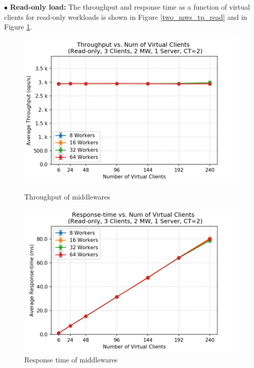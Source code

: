 $\bullet$ \textbf{Read-only load:} 
The throughput and response time as a function of virtual clients for read-only workloads is shown in Figure \ref{two_mws_tp_read} and in Figure \ref{two_mws_rt_read}. 
\begin{figure}[H]
   \begin{minipage}{0.48\textwidth}
     \centering
     \includegraphics[width=1\linewidth]{figures/2_BaselineWithMW/two_mws/two_mws_tp_read_2018-12-07_09h02.png}
     \caption{Throughput of middlewares}\label{two_mws_tp_read}
   \end{minipage}\hfill
   \begin{minipage}{0.48\textwidth}
     \centering
     \includegraphics[width=1\linewidth]{figures/2_BaselineWithMW/two_mws/two_mws_rt_read_2018-12-07_09h02.png}
     \caption{Response time of middlewares}\label{two_mws_rt_read}
   \end{minipage}
\end{figure}


